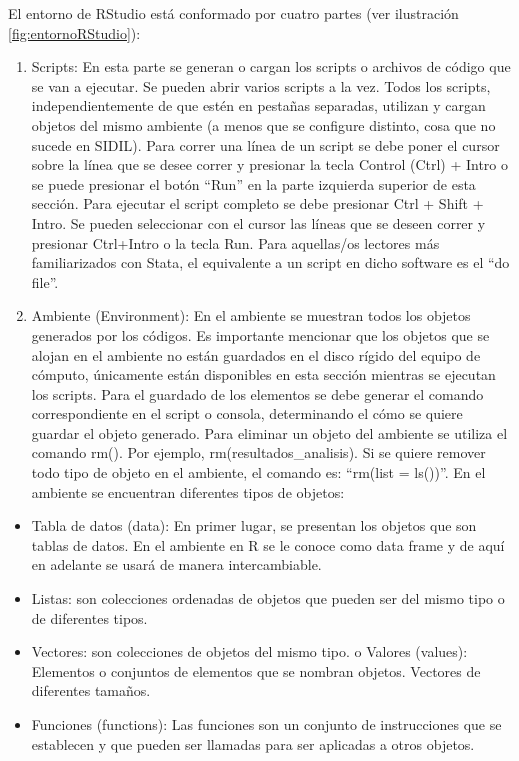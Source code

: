\documentclass[
]{article}
\providecommand{\tightlist}{%
  \setlength{\itemsep}{0pt}\setlength{\parskip}{0pt}}
\begin{document}
El entorno de RStudio está conformado por cuatro partes (ver ilustración \ref{fig:entornoRStudio}):

\begin{enumerate}
\def\labelenumi{\arabic{enumi}.}
\item
  Scripts: En esta parte se generan o cargan los scripts o archivos de código que se van a ejecutar. Se pueden abrir varios scripts a la vez. Todos los scripts, independientemente de que estén en pestañas separadas, utilizan y cargan objetos del mismo ambiente (a menos que se configure distinto, cosa que no sucede en SIDIL). Para correr una línea de un script se debe poner el cursor sobre la línea que se desee correr y presionar la tecla Control (Ctrl) + Intro o se puede presionar el botón ``Run'' en la parte izquierda superior de esta sección. Para ejecutar el script completo se debe presionar Ctrl + Shift + Intro. Se pueden seleccionar con el cursor las líneas que se deseen correr y presionar Ctrl+Intro o la tecla Run. Para aquellas/os lectores más familiarizados con Stata, el equivalente a un script en dicho software es el ``do file''.
\item
  Ambiente (Environment): En el ambiente se muestran todos los objetos generados por los códigos. Es importante mencionar que los objetos que se alojan en el ambiente no están guardados en el disco rígido del equipo de cómputo, únicamente están disponibles en esta sección mientras se ejecutan los scripts. Para el guardado de los elementos se debe generar el comando correspondiente en el script o consola, determinando el cómo se quiere guardar el objeto generado. Para eliminar un objeto del ambiente se utiliza el comando rm(). Por ejemplo, rm(resultados\_analisis). Si se quiere remover todo tipo de objeto en el ambiente, el comando es: ``rm(list = ls())''. En el ambiente se encuentran diferentes tipos de objetos:
\end{enumerate}

\begin{itemize}
\tightlist
\item
  Tabla de datos (data): En primer lugar, se presentan los objetos que son tablas de datos. En el ambiente en R se le conoce como data frame y de aquí en adelante se usará de manera intercambiable.
\item
  Listas: son colecciones ordenadas de objetos que pueden ser del mismo tipo o de diferentes tipos.
\item
  Vectores: son colecciones de objetos del mismo tipo. o Valores (values): Elementos o conjuntos de elementos que se nombran objetos. Vectores de diferentes tamaños.
\item
  Funciones (functions): Las funciones son un conjunto de instrucciones que se establecen y que pueden ser llamadas para ser aplicadas a otros objetos.
\end{itemize}
\end{document}
